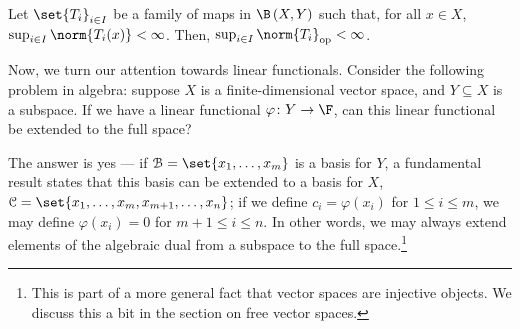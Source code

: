 \begin{theorem}\label{thm:uniform_boundedness}
  Let $\set{T_i}_{i\in I}$ be a family of maps in $\B\left(X,Y\right)$ such that, for all $x\in X$, $\sup_{i\in I}\norm{T_i(x)} < \infty$. Then, $\sup_{i\in I}\norm{T_i}_{\op} < \infty$.
\end{theorem}
Now, we turn our attention towards linear functionals. Consider the following problem in algebra: suppose $X$ is a finite-dimensional vector space, and $Y\subseteq X$ is a subspace. If we have a linear functional $\varphi\colon Y\rightarrow \F$, can this linear functional be extended to the full space?\newline

The answer is yes --- if $\mathcal{B} = \set{x_1,\dots,x_m}$ is a basis for $Y$, a fundamental result states that this basis can be extended to a basis for $X$, $\mathcal{C} = \set{x_1,\dots,x_m,x_{m+1},\dots,x_n}$; if we define $c_i = \varphi\left(x_i\right)$ for $1 \leq i \leq m$, we may define $\varphi\left(x_i\right) = 0$ for $m+1 \leq i \leq n$. In other words, we may always extend elements of the algebraic dual from a subspace to the full space.\footnote{This is part of a more general fact that vector spaces are injective objects. We discuss this a bit in the section on free vector spaces.}\newline

